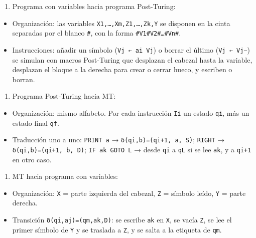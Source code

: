 \documentclass[12pt]{book} %
\providecommand{\tightlist}{%
  \setlength{\itemsep}{0pt}\setlength{\parskip}{0pt}}
\begin{document}
\begin{enumerate}
\def\labelenumi{\alph{enumi})}
\tightlist
\item
  Programa con variables hacia programa Post-Turing:
\end{enumerate}

\begin{itemize}
\tightlist
\item
  Organización: las variables \texttt{X1,…,Xm,Z1,…,Zk,Y} se disponen en
  la cinta separadas por el blanco \texttt{\#}, con la forma
  \texttt{\#V1\#V2\#…\#Vn\#}.
\item
  Instrucciones: añadir un símbolo (\texttt{Vj\ ←\ ai\ Vj}) o borrar el
  último (\texttt{Vj\ ←\ Vj−}) se simulan con macros Post-Turing que
  desplazan el cabezal hasta la variable, desplazan el bloque a la
  derecha para crear o cerrar hueco, y escriben o borran.
\end{itemize}

\begin{enumerate}
\def\labelenumi{\alph{enumi})}
\setcounter{enumi}{1}
\tightlist
\item
  Programa Post-Turing hacia MT:
\end{enumerate}

\begin{itemize}
\tightlist
\item
  Organización: mismo alfabeto. Por cada instrucción \texttt{Ii} un
  estado \texttt{qi}, más un estado final \texttt{qf}.
\item
  Traducción uno a uno: \texttt{PRINT\ a} →
  \texttt{δ(qi,b)=(qi+1,\ a,\ S)}; \texttt{RIGHT} →
  \texttt{δ(qi,b)=(qi+1,\ b,\ D)}; \texttt{IF\ ak\ GOTO\ L} → desde
  \texttt{qi} a \texttt{qL} si se lee \texttt{ak}, y a \texttt{qi+1} en
  otro caso.
\end{itemize}

\begin{enumerate}
\def\labelenumi{\alph{enumi})}
\setcounter{enumi}{2}
\tightlist
\item
  MT hacia programa con variables:
\end{enumerate}

\begin{itemize}
\tightlist
\item
  Organización: \texttt{X} = parte izquierda del cabezal, \texttt{Z} =
  símbolo leído, \texttt{Y} = parte derecha.
\item
  Transición \texttt{δ(qi,aj)=(qm,ak,D)}: se escribe \texttt{ak} en
  \texttt{X}, se vacía \texttt{Z}, se lee el primer símbolo de
  \texttt{Y} y se traslada a \texttt{Z}, y se salta a la etiqueta de
  \texttt{qm}.
\end{itemize}
\end{document}
